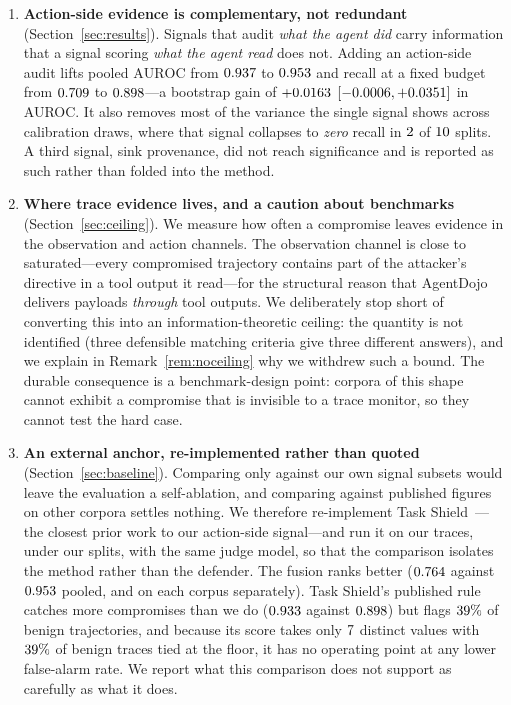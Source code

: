 \documentclass[preprint,12pt,authoryear]{elsarticle}
\theoremstyle{definition}
\begin{document}
\begin{enumerate}
\item \textbf{Action-side evidence is complementary, not redundant}
(Section~\ref{sec:results}). Signals that audit \emph{what the agent did} carry
information that a signal scoring \emph{what the agent read} does not. Adding
an action-side audit lifts pooled $\mathrm{AUROC}$ from $0.937$ to
$0.953$ and recall at a fixed budget from $0.709$ to
$0.898$---a bootstrap gain of $+0.0163$
$[-0.0006, +0.0351]$ in AUROC. It also removes most of the
variance the single signal shows across calibration draws, where that signal
collapses to \emph{zero} recall in $2$ of $10$ splits. A third
signal, sink provenance, did not reach significance and is reported as such rather
than folded into the method.

\item \textbf{Where trace evidence lives, and a caution about benchmarks}
(Section~\ref{sec:ceiling}). We measure how often a compromise leaves evidence in
the observation and action channels. The observation channel is close to
saturated---every compromised trajectory contains part of the attacker's directive
in a tool output it read---for the structural reason that AgentDojo delivers
payloads \emph{through} tool outputs. We deliberately stop short of converting
this into an information-theoretic ceiling: the quantity is not identified (three
defensible matching criteria give three different answers), and we explain in
Remark~\ref{rem:noceiling} why we withdrew such a bound.
The durable consequence is a benchmark-design point: corpora of this
shape cannot exhibit a compromise that is invisible to a trace monitor, so they
cannot test the hard case.

\item \textbf{An external anchor, re-implemented rather than quoted}
(Section~\ref{sec:baseline}). Comparing only against our own signal subsets would
leave the evaluation a self-ablation, and comparing against published figures on
other corpora settles nothing. We therefore re-implement Task
Shield~\citep{jia2024taskshield}---the closest prior work to our action-side
signal---and run it on our traces, under our splits, with the same judge model, so
that the comparison isolates the method rather than the defender. The fusion ranks
better ($0.764$ against $0.953$ pooled, and on each corpus
separately). Task Shield's published rule catches more compromises than we do
($0.933$ against $0.898$) but flags $39\%$ of benign
trajectories, and because its score takes only $7$ distinct values
with $39\%$ of benign traces tied at the floor, it has no operating
point at any lower false-alarm rate. We report what this comparison does not
support as carefully as what it does.


\end{enumerate}
\end{document}
